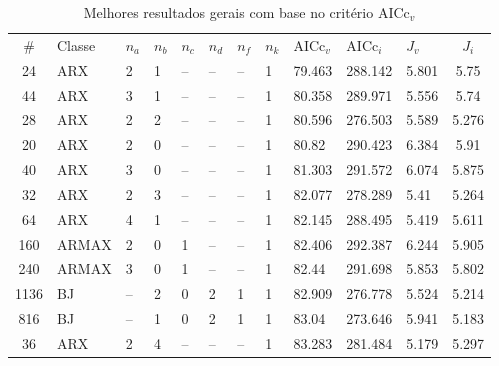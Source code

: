 \documentclass{ppgeesa}
\begin{document}
\begin{table}
  \caption{Melhores resultados gerais com base no critério $\text{AICc}_v$}
  \label{tab:results}
  \setlength{\extrarowheight}{1pt}
  \begin{tabularx}{\textwidth}{@{} c *{10}{C} c @{}}
    \toprule
    \#   & Classe & $n_a$   & $n_b$   & $n_c$   & $n_d$   & $n_f$   & $n_k$   & $\text{AICc}_v$ & $\text{AICc}_i$ & $J_v$  & $J_i$       \\
    24   & ARX    & \num{2} & \num{1} &  --     &  --       &  --   & \num{1} & \num{79.463} & \num{288.142} & \num{5.801} & \num{5.75}  \\
    44   & ARX    & \num{3} & \num{1} &  --     &  --       &  --   & \num{1} & \num{80.358} & \num{289.971} & \num{5.556} & \num{5.74}  \\
    28   & ARX    & \num{2} & \num{2} &  --     &  --       &  --   & \num{1} & \num{80.596} & \num{276.503} & \num{5.589} & \num{5.276} \\
    20   & ARX    & \num{2} & \num{0} &  --     &  --       &  --   & \num{1} & \num{80.82 } & \num{290.423} & \num{6.384} & \num{5.91}  \\
    40   & ARX    & \num{3} & \num{0} &  --     &  --       &  --   & \num{1} & \num{81.303} & \num{291.572} & \num{6.074} & \num{5.875} \\
    32   & ARX    & \num{2} & \num{3} &  --     &  --       &  --   & \num{1} & \num{82.077} & \num{278.289} & \num{5.41 } & \num{5.264} \\
    64   & ARX    & \num{4} & \num{1} &  --     &  --       &  --   & \num{1} & \num{82.145} & \num{288.495} & \num{5.419} & \num{5.611} \\
    160  & ARMAX  & \num{2} & \num{0} & \num{1} &  --       &  --   & \num{1} & \num{82.406} & \num{292.387} & \num{6.244} & \num{5.905} \\
    240  & ARMAX  & \num{3} & \num{0} & \num{1} &  --       &  --   & \num{1} & \num{82.44 } & \num{291.698} & \num{5.853} & \num{5.802} \\
    1136 & BJ     &  --     & \num{2} & \num{0} & \num{2} & \num{1} & \num{1} & \num{82.909} & \num{276.778} & \num{5.524} & \num{5.214} \\
    816  & BJ     &  --     & \num{1} & \num{0} & \num{2} & \num{1} & \num{1} & \num{83.04 } & \num{273.646} & \num{5.941} & \num{5.183} \\
    36   & ARX    & \num{2} & \num{4} &  --     &  --       &  --   & \num{1} & \num{83.283} & \num{281.484} & \num{5.179} & \num{5.297} \\

\end{tabularx}
\end{table}
\end{document}
